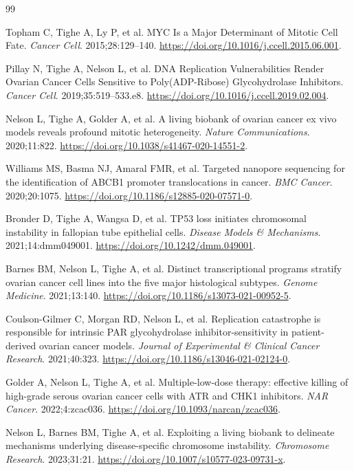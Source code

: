 \begin{thebibliography}{99}

Topham C, Tighe A, Ly P, et al. MYC Is a Major Determinant of Mitotic Cell
Fate. \emph{Cancer Cell}. 2015;28:129--140.
\url{https://doi.org/10.1016/j.ccell.2015.06.001}.

Pillay N, Tighe A, Nelson L, et al. DNA Replication Vulnerabilities Render
Ovarian Cancer Cells Sensitive to Poly(ADP-Ribose) Glycohydrolase Inhibitors.
\emph{Cancer Cell}. 2019;35:519--533.e8.
\url{https://doi.org/10.1016/j.ccell.2019.02.004}.

Nelson L, Tighe A, Golder A, et al. A living biobank of ovarian cancer ex vivo
models reveals profound mitotic heterogeneity. \emph{Nature Communications}.
2020;11:822. \url{https://doi.org/10.1038/s41467-020-14551-2}.

Williams MS, Basma NJ, Amaral FMR, et al. Targeted nanopore sequencing for the
identification of ABCB1 promoter translocations in cancer. \emph{BMC Cancer}.
2020;20:1075. \url{https://doi.org/10.1186/s12885-020-07571-0}.

Bronder D, Tighe A, Wangsa D, et al. TP53 loss initiates chromosomal
instability in fallopian tube epithelial cells. \emph{Disease Models \&
Mechanisms}. 2021;14:dmm049001.
\url{https://doi.org/10.1242/dmm.049001}.

Barnes BM, Nelson L, Tighe A, et al. Distinct transcriptional programs
stratify ovarian cancer cell lines into the five major histological subtypes.
\emph{Genome Medicine}. 2021;13:140.
\url{https://doi.org/10.1186/s13073-021-00952-5}.

Coulson-Gilmer C, Morgan RD, Nelson L, et al. Replication catastrophe is
responsible for intrinsic PAR glycohydrolase inhibitor-sensitivity in
patient-derived ovarian cancer models. \emph{Journal of Experimental \&
Clinical Cancer Research}. 2021;40:323.
\url{https://doi.org/10.1186/s13046-021-02124-0}.

Golder A, Nelson L, Tighe A, et al. Multiple-low-dose therapy: effective
killing of high-grade serous ovarian cancer cells with ATR and CHK1
inhibitors. \emph{NAR Cancer}. 2022;4:zcac036.
\url{https://doi.org/10.1093/narcan/zcac036}.

Nelson L, Barnes BM, Tighe A, et al. Exploiting a living biobank to delineate
mechanisms underlying disease-specific chromosome instability.
\emph{Chromosome Research}. 2023;31:21.
\url{https://doi.org/10.1007/s10577-023-09731-x}.


\end{thebibliography}
